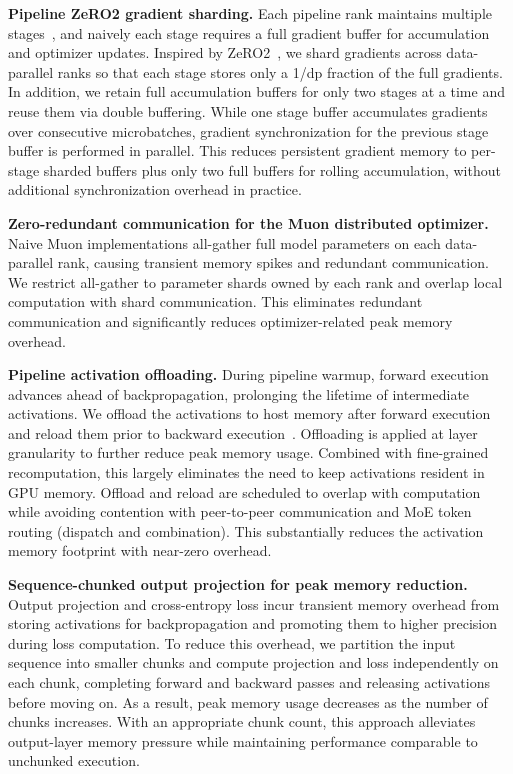\documentclass{article}
\theoremstyle{definition}
\begin{document}
\textbf{Pipeline ZeRO2 gradient sharding.} Each pipeline rank maintains multiple stages~\cite{narayanan2021efficientlargescalelanguagemodel}, and naively each stage requires a full gradient buffer for accumulation and optimizer updates. Inspired by ZeRO2~\cite{rajbhandari2020zeromemoryoptimizationstraining}, we shard gradients across data-parallel ranks so that each stage stores only a 1/dp fraction of the full gradients. In addition, we retain full accumulation buffers for only two stages at a time and reuse them via double buffering. While one stage buffer accumulates gradients over consecutive microbatches, gradient synchronization for the previous stage buffer is performed in parallel. This reduces persistent gradient memory to per-stage sharded buffers plus only two full buffers for rolling accumulation, without additional synchronization overhead in practice.

\textbf{Zero-redundant communication for the Muon distributed optimizer.} Naive Muon implementations all-gather full model parameters on each data-parallel rank, causing transient memory spikes and redundant communication. We restrict all-gather to parameter shards owned by each rank and overlap local computation with shard communication. This eliminates redundant communication and significantly reduces optimizer-related peak memory overhead.

\textbf{Pipeline activation offloading.} During pipeline warmup, forward execution advances ahead of backpropagation, prolonging the lifetime of intermediate activations. We offload the activations to host memory after forward execution and reload them prior to backward execution~\cite{298555}. Offloading is applied at layer granularity to further reduce peak memory usage. Combined with fine-grained recomputation, this largely eliminates the need to keep activations resident in GPU memory. Offload and reload are scheduled to overlap with computation while avoiding contention with peer-to-peer communication and MoE token routing (dispatch and combination). This substantially reduces the activation memory footprint with near-zero overhead.

\textbf{Sequence-chunked output projection for peak memory reduction.} 
Output projection and cross-entropy loss incur transient memory overhead from storing activations for backpropagation and promoting them to higher precision during loss computation. To reduce this overhead, we partition the input sequence into smaller chunks and compute projection and loss independently on each chunk, completing forward and backward passes and releasing activations before moving on. As a result, peak memory usage decreases as the number of chunks increases. With an appropriate chunk count, this approach alleviates output-layer memory pressure while maintaining performance comparable to unchunked execution.
\end{document}
